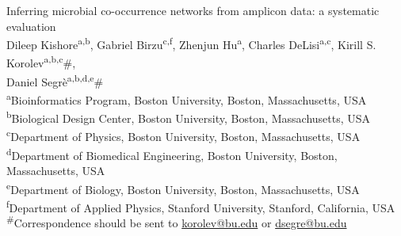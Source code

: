 \documentclass[letterpaper,12pt]{article}
\begin{document}

\begin{titlepage}

  \newcommand{\HRule}{\rule{\linewidth}{0.5mm}} %

  \center %





  \vspace*{\fill}
  {\huge Inferring microbial co-occurrence networks from amplicon data: a systematic evaluation}\\[0.4cm]


  \vspace{1.5 cm}
  Dileep Kishore\textsuperscript{a,b},
  Gabriel Birzu\textsuperscript{c,f},
  Zhenjun Hu\textsuperscript{a},
  Charles DeLisi\textsuperscript{a,c},
  Kirill S. Korolev\textsuperscript{a,b,c}\#,\\
  Daniel Segr\`{e}\textsuperscript{a,b,d,e}\#\\
  \vspace{1cm}
  \textsuperscript{a}Bioinformatics Program, Boston University, Boston, Massachusetts, USA\\
  \textsuperscript{b}Biological Design Center, Boston University, Boston, Massachusetts, USA\\
  \textsuperscript{c}Department of Physics, Boston University, Boston, Massachusetts, USA\\
  \textsuperscript{d}Department of Biomedical Engineering, Boston University, Boston, Massachusetts, USA\\
  \textsuperscript{e}Department of Biology, Boston University, Boston, Massachusetts, USA\\
  \textsuperscript{f}Department of Applied Physics, Stanford University, Stanford, California, USA\\
  \textsuperscript{$\#$}Correspondence should be sent to \href{mailto:korolev@bu.edu}{korolev@bu.edu} or \href{mailto:dsegre@bu.edu}{dsegre@bu.edu}\\


\end{titlepage}
\end{document}

